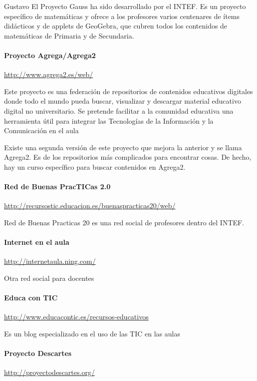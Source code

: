 \begin{opin}{\guscolor}{Gustavo}
El Proyecto Gauss ha sido desarrollado por el INTEF. Es un proyecto específico de matemáticas y ofrece a los profesores varios centenares de ítems didácticos y de applets de GeoGebra, que cubren todos los contenidos de matemáticas de Primaria y de Secundaria.

\paragraph{Proyecto Agrega/Agrega2}
\url{http://www.agrega2.es/web/}

Este proyecto es una federación de repositorios de contenidos educativos digitales donde todo el mundo pueda buscar, visualizar y descargar material educativo digital no universitario.  Se pretende facilitar a la comunidad educativa una herramienta útil para integrar las Tecnologías de la Información y la Comunicación en el aula

Existe una segunda versión de este proyecto que mejora la anterior y se llama Agrega2. Es de los repositorios más complicados para encontrar cosas. De hecho, hay un curso específico para buscar contenidos en Agrega2.

\paragraph{Red de Buenas PracTICas 2.0}
\url{http://recursostic.educacion.es/buenaspracticas20/web/}

Red de Buenas Practicas 20 es una red social de profesores dentro del INTEF.

\paragraph{Internet en el aula}
\url{http://internetaula.ning.com/}

Otra red social para docentes

\paragraph{Educa con TIC}
\url{http://www.educacontic.es/recursos-educativos}

Es un blog especializado en el uso de las TIC en las aulas

\paragraph{Proyecto Descartes}
\url{http://proyectodescartes.org/}


\end{opin}
